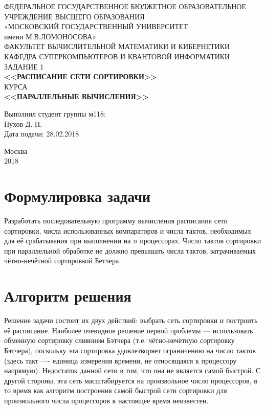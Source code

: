 \documentclass[14pt]{extarticle}
\begin{document}
\begin{titlepage}
	\begin{center}
		\small{ФЕДЕРАЛЬНОЕ ГОСУДАРСТВЕННОЕ БЮДЖЕТНОЕ ОБРАЗОВАТЕЛЬНОЕ}\\ 
			УЧРЕЖДЕНИЕ ВЫСШЕГО ОБРАЗОВАНИЯ\\
			«МОСКОВСКИЙ ГОСУДАРСТВЕННЫЙ УНИВЕРСИТЕТ\\
			имени М.В.ЛОМОНОСОВА»\\
		\hfill \break
		ФАКУЛЬТЕТ ВЫЧИСЛИТЕЛЬНОЙ МАТЕМАТИКИ И КИБЕРНЕТИКИ\\
		КАФЕДРА СУПЕРКОМПЬЮТЕРОВ И КВАНТОВОЙ ИНФОРМАТИКИ\\
		\vfill
		ЗАДАНИЕ 1 \\
		\textbf{<<РАСПИСАНИЕ СЕТИ СОРТИРОВКИ>>}\\
		КУРСА \\
		\textbf{<<ПАРАЛЛЕЛЬНЫЕ ВЫЧИСЛЕНИЯ>>}\\
	\end{center}	
	\vfill
	\begin{flushright}
		Выполнил студент группы м118:\\
		Пухов Д. Н.\\
		Дата подачи: 28.02.2018
		\vfill
	\end{flushright}
	
	
	\begin{center}
		Москва \\
		2018
	\end{center}
	
	\thispagestyle{empty}

\end{titlepage}

\tableofcontents
\newpage



\section{Формулировка задачи}
Разработать последовательную программу вычисления расписания сети сортировки, числа использованных компараторов и числа тактов, необходимых для её срабатывания при выполнении на $n$ процессорах. Число тактов сортировки при параллельной обработке не должно превышать числа тактов, затрачиваемых чётно-нечётной сортировкой Бетчера.

\section{Алгоритм решения}
Решение задачи состоит их двух действий: выбрать сеть сортировки и построить её расписание.
Наиболее очевидное решение первой проблемы --- использовать обменную сортировку слиянием Бэтчера (т.е. чётно-нечётную сортировку Бэтчера), поскольку эта сортировка удовлетворяет ограничению на число тактов (здесь такт ---- единица измерения времени, не относящаяся к процессору напрямую). Недостаток данной сети в том, что она не является самой быстрой. С другой стороны, эта сеть масштабируется на произвольное число процессоров, в то время как алгоритм построения самой быстрой сети сортировки для произвольного числа процессоров в настоящее время неизвестен.
\end{document}
